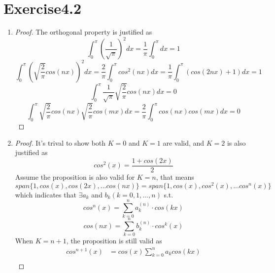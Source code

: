 \documentclass[paper=a4, fontsize=11pt]{scrartcl} %
\numberwithin{equation}{section} %
\numberwithin{figure}{section} %
\numberwithin{table}{section} %
\begin{document}
\section{Exercise4.2}
	\begin{enumerate}
		\item 
			\begin{proof}
				The orthogonal property is justified as
				\begin{equation}
					\int_{0}^{\pi} (\frac{1}{\sqrt{\pi}})^2 dx = \frac{1}{\pi} \int_{0}^{\pi} dx = 1
				\end{equation}
				\begin{equation}
					\int_{0}^{\pi} (\sqrt{\frac{2}{\pi}}cos(nx))^2 dx = \frac{2}{\pi} \int_{0}^{\pi} cos^2(nx)dx = \frac{1}{\pi} \int_{0}^{\pi} (cos(2nx) + 1) dx = 1
				\end{equation}
				\begin{equation}
					\int_{0}^{\pi} \frac{1}{\sqrt{\pi}} \sqrt{\frac{2}{\pi}}cos(nx) dx = 0
				\end{equation}
				\begin{equation}
					\int_{0}^{\pi} \sqrt{\frac{2}{\pi}}cos(nx) \sqrt{\frac{2}{\pi}}cos(mx) dx = \frac{2}{\pi} \int_{0}^{\pi} cos(nx) cos(mx) dx = 0
				\end{equation}
			\end{proof}
		\item 
			\begin{proof}
				It's trival to show both $K=0$ and $K=1$ are valid, and $K=2$ is also justified as
				\begin{equation}
					cos^2(x) = \frac{1+cos(2x)}{2}
				\end{equation}
				Assume the proposition is also valid for $K=n$, that means
				\begin{equation}
					span\{1, cos(x), cos(2x), ... cos(nx)\} = span\{1, cos(x), cos^2(x), ... cos^n(x)\}
				\end{equation}
				which indicates that $\exists a_k$ and $b_k (k=0, 1, ..., n)$ s.t. 
				\begin{equation}
					cos^n(x) = \sum_{k=0}^{n} a^{(n)}_k \cdot cos(kx)
				\end{equation}
				\begin{equation}
					cos(nx) = \sum_{k=0}^{n} b^{(n)}_k \cdot cos^k(x)
				\end{equation}
				When $K = n+1$, the proposition is still valid as
				\begin{equation}
					\begin{aligned}
						cos^{n+1}(x) & = cos(x) \sum_{k=0}^{n} a_k cos(kx)\\

\end{aligned}
\end{equation}
\end{proof}
\end{enumerate}
\end{document}
